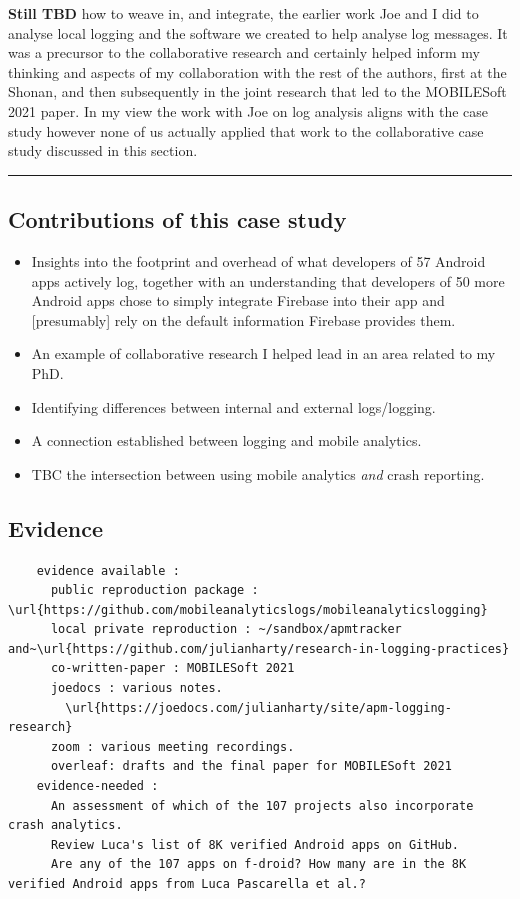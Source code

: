 \textbf{Still TBD} how to weave in, and integrate, the earlier work Joe and I did to analyse local logging and the software we created to help analyse log messages. It was a precursor to the collaborative research and certainly helped inform my thinking and aspects of my collaboration with the rest of the authors, first at the Shonan, and then subsequently in the joint research that led to the MOBILESoft 2021 paper. In my view the work with Joe on log analysis aligns with the case study however none of us actually applied that work to the collaborative case study discussed in this section.

\par\noindent\rule{\textwidth}{0.4pt}

\subsection*{Contributions of this case study}
\begin{itemize}
    \item Insights into the footprint and overhead of what developers of 57 Android apps actively log, together with an understanding that developers of 50 more Android apps chose to simply integrate Firebase into their app and [presumably] rely on the default information Firebase provides them.
    \item An example of collaborative research I helped lead in an area related to my PhD.
    \item Identifying differences between internal and external logs/logging.
    \item A connection established between logging and mobile analytics.
    \item TBC the intersection between using mobile analytics \textit{and} crash reporting.
\end{itemize}



\subsection*{Evidence}
  \begin{verbatim}
    evidence available :
      public reproduction package : \url{https://github.com/mobileanalyticslogs/mobileanalyticslogging}
      local private reproduction : ~/sandbox/apmtracker and~\url{https://github.com/julianharty/research-in-logging-practices}
      co-written-paper : MOBILESoft 2021
      joedocs : various notes.
        \url{https://joedocs.com/julianharty/site/apm-logging-research}
      zoom : various meeting recordings.
      overleaf: drafts and the final paper for MOBILESoft 2021
    evidence-needed : 
      An assessment of which of the 107 projects also incorporate crash analytics.
      Review Luca's list of 8K verified Android apps on GitHub.
      Are any of the 107 apps on f-droid? How many are in the 8K verified Android apps from Luca Pascarella et al.?
  \end{verbatim}  



